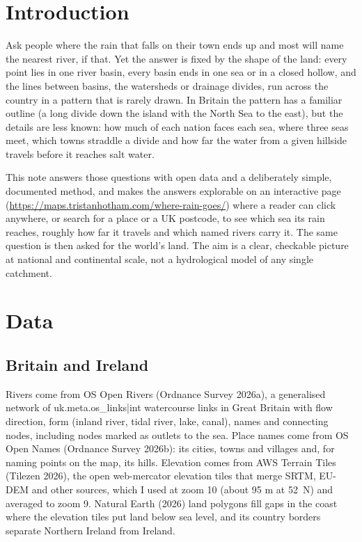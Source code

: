 \documentclass[11pt,a4paper]{article}
\begin{document}
\section{Introduction}

Ask people where the rain that falls on their town ends up and most will name the nearest river, if that. Yet the answer is fixed by the shape of the land: every point lies in one river basin, every basin ends in one sea or in a closed hollow, and the lines between basins, the watersheds or drainage divides, run across the country in a pattern that is rarely drawn. In Britain the pattern has a familiar outline (a long divide down the island with the North Sea to the east), but the details are less known: how much of each nation faces each sea, where three seas meet, which towns straddle a divide and how far the water from a given hillside travels before it reaches salt water.

This note answers those questions with open data and a deliberately simple, documented method, and makes the answers explorable on an interactive page (\url{https://maps.tristanhotham.com/where-rain-goes/}) where a reader can click anywhere, or search for a place or a UK postcode, to see which sea its rain reaches, roughly how far it travels and which named rivers carry it. The same question is then asked for the world's land. The aim is a clear, checkable picture at national and continental scale, not a hydrological model of any single catchment.

\section{Data}

\subsection{Britain and Ireland}

Rivers come from OS Open Rivers (Ordnance Survey 2026a), a generalised network of {{uk.meta.os_links|int}} watercourse links in Great Britain with flow direction, form (inland river, tidal river, lake, canal), names and connecting nodes, including nodes marked as outlets to the sea. Place names come from OS Open Names (Ordnance Survey 2026b): its cities, towns and villages and, for naming points on the map, its hills. Elevation comes from AWS Terrain Tiles (Tilezen 2026), the open web-mercator elevation tiles that merge SRTM, EU-DEM and other sources, which I used at zoom 10 (about 95 m at 52\textdegree\ N) and averaged to zoom 9. Natural Earth (2026) land polygons fill gaps in the coast where the elevation tiles put land below sea level, and its country borders separate Northern Ireland from Ireland.
\end{document}
